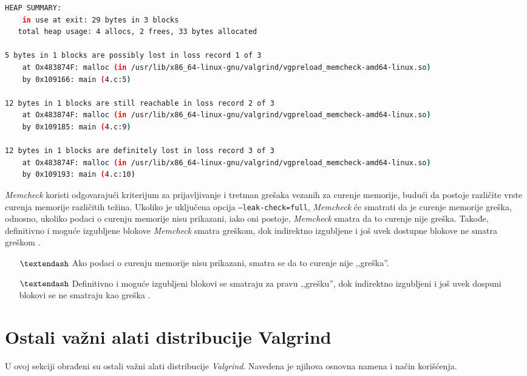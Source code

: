 \documentclass[12pt,oneside]{memoir}
\theoremstyle{plain}
\theoremstyle{definition}
\begin{document}
\begin{lstlisting}[style=terminal,caption={Izveštaj o curenju memorije}, label={lst:slika2.14},language={bash}] 
HEAP SUMMARY:
    in use at exit: 29 bytes in 3 blocks
   total heap usage: 4 allocs, 2 frees, 33 bytes allocated
   
5 bytes in 1 blocks are possibly lost in loss record 1 of 3
    at Ox483874F: malloc (in /usr/lib/x86_64-linux-gnu/valgrind/vgpreload_memcheck-amd64-linux.so)
    by 0x109166: main (4.c:5)

12 bytes in 1 blocks are still reachable in loss record 2 of 3
    at Ox483874F: malloc (in /usr/lib/x86_64-linux-gnu/valgrind/vgpreload_memcheck-amd64-linux.so)
    by 0x109185: main (4.c:9)

12 bytes in 1 blocks are definitely lost in loss record 3 of 3
    at Ox483874F: malloc (in /usr/lib/x86_64-linux-gnu/valgrind/vgpreload_memcheck-amd64-linux.so)
    by 0x109193: main (4.c:10)
\end{lstlisting}

\textit{Memcheck} koristi odgovarajući kriterijum za prijavljivanje i tretman grešaka vezanih za curenje memorije, budući da postoje različite vrste curenja memorije različitih težina. Ukoliko je uključena opcija \texttt{--leak-check=full}, \textit{Memcheck} će smatrati da je curenje memorije greška, odnosno, ukoliko podaci o curenju memorije nisu prikazani, iako oni postoje, \textit{Memcheck} smatra da to curenje nije greška. Takođe, definitivno i moguće izgubljene blokove \textit{Memcheck} smatra greškom, dok indirektno izgubljene i još uvek dostupne blokove ne smatra greškom \cite{Memcheck}.

\begin{itemize}
\item[$\textendash$] Ako podaci o curenju memorije nisu prikazani, smatra se da to curenje nije ,,greška''.
\item[$\textendash$] Definitivno i moguće izgubljeni blokovi se smatraju za pravu ,,grešku'', dok indirektno izgubljeni i još uvek dospuni blokovi se ne smatraju kao greška \cite{ValgrindDOC}. 
\end{itemize}

\section{Ostali važni alati distribucije Valgrind}

U ovoj sekciji obrađeni su ostali važni alati distribucije \textit{Valgrind}. Navedena je njihova osnovna namena i način korišćenja. 
\end{document}
